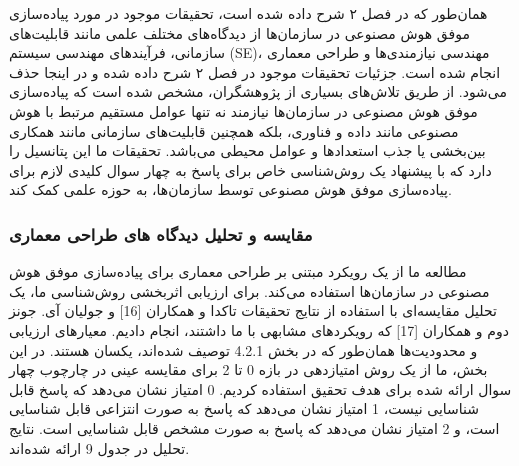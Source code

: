 \documentclass[a4paper,10pt]{article}
\begin{document}
                    همان‌طور که در فصل ۲ شرح داده شده است، تحقیقات موجود در مورد پیاده‌سازی موفق هوش مصنوعی در سازمان‌ها از دیدگاه‌های مختلف علمی مانند قابلیت‌های سازمانی، فرآیندهای مهندسی سیستم (SE)، مهندسی نیازمندی‌ها و طراحی معماری انجام شده است. جزئیات تحقیقات موجود در فصل ۲ شرح داده شده و در اینجا حذف می‌شود. از طریق تلاش‌های بسیاری از پژوهشگران، مشخص شده است که پیاده‌سازی موفق هوش مصنوعی در سازمان‌ها نیازمند نه تنها عوامل مستقیم مرتبط با هوش مصنوعی مانند داده و فناوری، بلکه همچنین قابلیت‌های سازمانی مانند همکاری بین‌بخشی یا جذب استعدادها و عوامل محیطی می‌باشد. تحقیقات ما این پتانسیل را دارد که با پیشنهاد یک روش‌شناسی خاص برای پاسخ به چهار سوال کلیدی لازم برای پیاده‌سازی موفق هوش مصنوعی توسط سازمان‌ها، به حوزه علمی کمک کند.

                \subsubsection{مقایسه و تحلیل دیدگاه های طراحی معماری}

                    مطالعه ما از یک رویکرد مبتنی بر طراحی معماری برای پیاده‌سازی موفق هوش مصنوعی در سازمان‌ها استفاده می‌کند. برای ارزیابی اثربخشی روش‌شناسی ما، یک تحلیل مقایسه‌ای با استفاده از نتایج تحقیقات تاکدا و همکاران [16] و جولیان آی. جونز دوم و همکاران [17] که رویکردهای مشابهی با ما داشتند، انجام دادیم. معیارهای ارزیابی و محدودیت‌ها همان‌طور که در بخش 4.2.1 توصیف شده‌اند، یکسان هستند. در این بخش، ما از یک روش امتیازدهی در بازه 0 تا 2 برای مقایسه عینی در چارچوب چهار سوال ارائه شده برای هدف تحقیق استفاده کردیم. 0 امتیاز نشان می‌دهد که پاسخ قابل شناسایی نیست، 1 امتیاز نشان می‌دهد که پاسخ به صورت انتزاعی قابل شناسایی است، و 2 امتیاز نشان می‌دهد که پاسخ به صورت مشخص قابل شناسایی است. نتایج تحلیل در جدول 9 ارائه شده‌اند.
\end{document}
